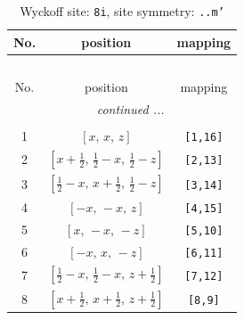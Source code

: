 \documentclass[fleqn,8pt]{jsarticle}
\begin{document}
\begin{longtable}{ccc}
\caption{Wyckoff site: {\tt 8i}, site symmetry: {\tt ..m'}}
 \\
 \hline \hline
No. & position & mapping \\ \hline \endfirsthead

\multicolumn{2}{l}{\tablename\ \thetable{}} \\
 \hline \hline
No. & position & mapping \\ \hline \endhead

 \hline \hline
\multicolumn{2}{r}{\footnotesize\it continued ...} \\ \endfoot

 \hline \hline
\multicolumn{2}{r}{} \\ \endlastfoot

1 & $\left[ x,\, x,\, z \right]$ & {\tt [1,16]} \\ \hline
2 & $\left[ x + \frac{1}{2},\, \frac{1}{2} - x,\, \frac{1}{2} - z \right]$ & {\tt [2,13]} \\ \hline
3 & $\left[ \frac{1}{2} - x,\, x + \frac{1}{2},\, \frac{1}{2} - z \right]$ & {\tt [3,14]} \\ \hline
4 & $\left[ - x,\, - x,\, z \right]$ & {\tt [4,15]} \\ \hline
5 & $\left[ x,\, - x,\, - z \right]$ & {\tt [5,10]} \\ \hline
6 & $\left[ - x,\, x,\, - z \right]$ & {\tt [6,11]} \\ \hline
7 & $\left[ \frac{1}{2} - x,\, \frac{1}{2} - x,\, z + \frac{1}{2} \right]$ & {\tt [7,12]} \\ \hline
8 & $\left[ x + \frac{1}{2},\, x + \frac{1}{2},\, z + \frac{1}{2} \right]$ & {\tt [8,9]} \\
\end{longtable}
\renewcommand{\arraystretch}{1.2}
\end{document}
